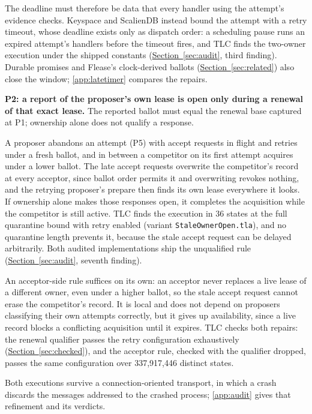 \documentclass[final,5p,times,twocolumn,number]{elsarticle}
\newcommand{\code}[1]{\texttt{#1}}
\newcommand{\secref}[1]{\hyperref[#1]{Section~\ref*{#1}}}
\begin{document}
The deadline must therefore be data that every handler using the attempt's evidence checks.  Keyspace and ScalienDB instead bound the attempt with a retry timeout, whose deadline exists only as dispatch order: a scheduling pause runs an expired attempt's handlers before the timeout fires, and TLC finds the two-owner execution under the shipped constants (\secref{sec:audit}, third finding).  Durable promises and Flease's clock-derived ballots (\secref{sec:related}) also close the window; \ref{app:latetimer} compares the repairs.

\smallskip
\noindent\textbf{P2: a report of the proposer's own lease is open only during a renewal of that exact lease.}  The reported ballot must equal the renewal base captured at P1; ownership alone does not qualify a response.

A proposer abandons an attempt (P5) with accept requests in flight and retries under a fresh ballot, and in between a competitor on its first attempt acquires under a lower ballot.  The late accept requests overwrite the competitor's record at every acceptor, since ballot order permits it and overwriting revokes nothing, and the retrying proposer's prepare then finds its own lease everywhere it looks.  If ownership alone makes those responses open, it completes the acquisition while the competitor is still active.  TLC finds the execution in 36 states at the full quarantine bound with retry enabled (variant \code{StaleOwnerOpen.tla}), and no quarantine length prevents it, because the stale accept request can be delayed arbitrarily.  Both audited implementations ship the unqualified rule (\secref{sec:audit}, seventh finding).

An acceptor-side rule suffices on its own: an acceptor never replaces a live lease of a different owner, even under a higher ballot, so the stale accept request cannot erase the competitor's record.  It is local and does not depend on proposers classifying their own attempts correctly, but it gives up availability, since a live record blocks a conflicting acquisition until it expires.  TLC checks both repairs: the renewal qualifier passes the retry configuration exhaustively (\secref{sec:checked}), and the acceptor rule, checked with the qualifier dropped, passes the same configuration over 337{,}917{,}446 distinct states.

Both executions survive a connection-oriented transport, in which a crash discards the messages addressed to the crashed process; \ref{app:audit} gives that refinement and its verdicts.
\end{document}
